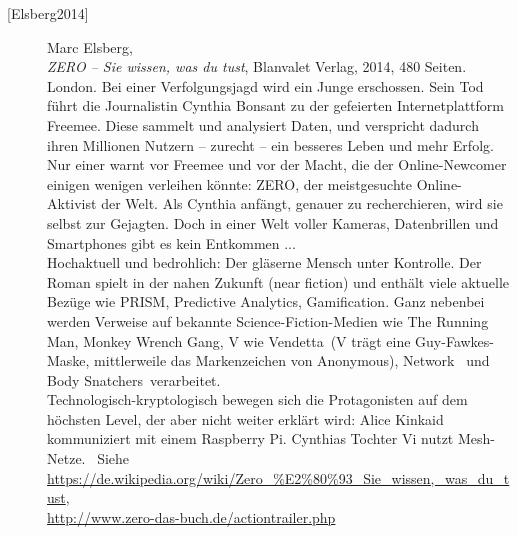 \begin{refsegment}
\begin{description}




\item[\textrm{[Elsberg2014]}] 
    Marc Elsberg,\\
    {\em ZERO -- Sie wissen, was du tust}, Blanvalet Verlag, 2014, 480 Seiten.\\
    London. Bei einer Verfolgungsjagd wird ein Junge erschossen. Sein Tod führt die
    Journalistin Cynthia Bonsant zu der gefeierten Internetplattform Freemee. Diese
    sammelt und analysiert Daten, und verspricht dadurch ihren Millionen Nutzern
    -- zurecht -- ein besseres Leben und mehr Erfolg. Nur einer warnt vor Freemee
    und vor der Macht, die der Online-Newcomer einigen wenigen verleihen könnte:
    ZERO, der meistgesuchte Online-Aktivist der Welt. Als Cynthia anfängt, genauer
    zu recherchieren, wird sie selbst zur Gejagten. Doch in einer Welt voller Kameras,
    Datenbrillen und Smartphones gibt es kein Entkommen ...\\
    Hochaktuell und bedrohlich: Der gläserne Mensch unter Kontrolle.
    Der Roman spielt in der nahen Zukunft (near fiction) und
    enthält viele aktuelle Bezüge wie PRISM, Predictive Analytics, Gamification.
    Ganz nebenbei werden Verweise auf bekannte Science-Fiction-Medien wie
    \glqq The Running Man\grqq, \glqq Monkey Wrench Gang\grqq, \glqq V wie
    Vendetta\grqq~(V trägt eine Guy-Fawkes-Maske, mittlerweile das Markenzeichen
    von Anonymous), \glqq Network\grqq~ und \glqq Body Snatchers\grqq~verarbeitet.\\
    Technologisch-kryptologisch bewegen sich die Protagonisten auf dem höchsten
    Level, der aber nicht weiter erklärt wird: Alice Kinkaid kommuniziert mit einem
    Raspberry Pi. Cynthias Tochter Vi nutzt Mesh-Netze. ~Siehe\\
    \url{https://de.wikipedia.org/wiki/Zero_%E2%80%93_Sie_wissen,_was_du_tust},\\
    \url{http://www.zero-das-buch.de/actiontrailer.php}\\




\end{description}
\end{refsegment}
